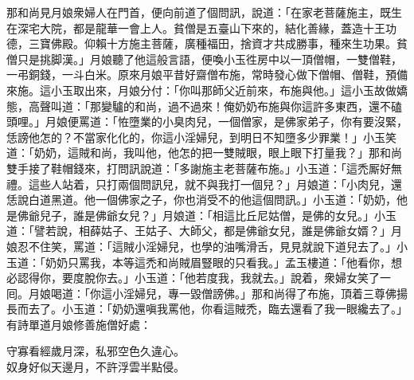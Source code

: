 那和尚見月娘衆婦人在門首，便向前道了個問訊，說道：「在家老菩薩施主，既生在深宅大院，都是龍華一會上人。貧僧是五臺山下來的，結化善緣，蓋造十王功德，三寶佛殿。仰賴十方施主菩薩，廣種福田，捨資才共成勝事，種來生功果。貧僧只是挑脚漢。」月娘聽了他這般言語，便喚小玉徃房中以一頂僧帽，一雙僧鞋，一弔銅錢，一斗白米。原來月娘平昔好齋僧布施，常時發心做下僧帽、僧鞋，預備來施。這小玉取出來，月娘分付：「你叫那師父近前來，布施與他。」這小玉故做嬌態，高聲叫道：「那變驢的和尚，過不過來！{}俺奶奶布施與你這許多東西，還不磕頭哩。」月娘便罵道：「恠墮業的小臭肉兒，一個僧家，是佛家弟子，你有要沒緊，恁謗他怎的？不當家化化的，你這小淫婦兒，到明日不知墮多少罪業！」小玉笑道：「奶奶，這賊和尚，我叫他，他怎的把一雙賊眼，眼上眼下打量我？」那和尚雙手接了鞋帽錢來，打問訊說道：「多謝施主老菩薩布施。」小玉道：「這禿厮好無禮。這些人站着，只打兩個問訊兒，就不與我打一個兒？」月娘道：「小肉兒，還恁說白道黑道。他一個佛家之子，你也消受不的他這個問訊。」小玉道：「奶奶，他是佛爺兒子，誰是佛爺女兒？」{}月娘道：「相這比丘尼姑僧，是佛的女兒。」小玉道：「譬若說，相薛姑子、王姑子、大師父，都是佛爺女兒，誰是佛爺女婿？」月娘忍不住笑，罵道：「這賊小淫婦兒，也學的油嘴滑舌，見見就說下道兒去了。」小玉道：「奶奶只罵我，本等這禿和尚賊眉豎眼的只看我。」{}孟玉樓道：「他看你，想必認得你，要度脫你去。」小玉道：「他若度我，我就去。」說着，衆婦女笑了一囘。月娘喝道：「你這小淫婦兒，專一毀僧謗佛。」那和尚得了布施，頂着三尊佛揚長而去了。小玉道：「奶奶還嗔我罵他，你看這賊禿，臨去還看了我一眼纔去了。」有詩單道月娘修善施僧好處：

\begin{myquote}
守寡看經歲月深，私邪空色久違心。\\奴身好似天邊月，不許浮雲半點侵。
\end{myquote}

